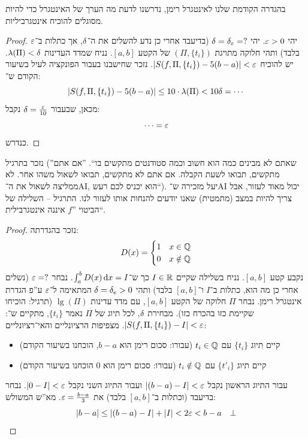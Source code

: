 \documentclass[]{../../../../tex/classes/styledArticle}
\begin{document}
	בהגדרה הקודמת שלנו לאינטגרל רימן, נדרשנו לדעת מה הערך של האינטגרל כדי להיות מסוגלים להוכיח אינטגרביליות. 
	\begin{proof}
		יהי $\eg > 0$. יהי $\dg  = \dg_\eg = ?$ (בדיעבד אחרי כן נדע להשלים את ה־$\delta$, אך כתלות ב־$\eg$ בלבד) ותהי חלוקה מתויגת $(\Pi, \{t_i\})$ של הקטע $[a, b]$. נניח שמדד העדינות $\lambda(\Pi) < \delta$. יש להוכיח $\sof{S(f, \Pi, \{t_i\}) - 5(b - a)} < \eg$. נזכר שחישבנו בעבור הפונקציה לעיל בשיעור הקודם ש־: 
		\[ \left \lvert S(f, \Pi, \{t_i\}) - 5(b-a) \right \rvert \le 10 \cdot \lambda(\Pi) < 10 \delta = \cdots \]
		מכאן, שבעבור $\dg = \frac{\eg}{10}$ נקבל: 
		\[ \cdots = \eg \]
		כנדרש. 
	\end{proof}
	
	נזכר בתרגיל (''שאתם לא מבינים כמה הוא חשוב וכמה סטודנטים מתקשים בו``. ''אם אתם מתקשים, תבואו לשעת הקבלה. אם אתם לא מתקשים, תבואו לשאול משהו אחר. לא ממליצה לשאול את ה־AI, הוא יכניס לכם רעש``). יעל מזכירה ש־AI יכול מאוד לעזור, אבל צריך להיות במצב (מתמטית) שאנו יודעים להנחות אותו לעזור לנו. התרגיל – השלילה של הביטוי ''$f$ איננה אינטגרבילית``. 
	
	\begin{proof}
		נזכר בהגדרתה: 
		\[ D(x) = \begin{cases}
			1 & x \in \mathbb{Q} \\
			0 & x \notin \mathbb{Q}
		\end{cases} \]
		נקבע קטע $[a, b]$. נניח בשלילה שקיים $I \in \mathbb{R}$  כך ש־$\int^b_a D(x) \,\mathrm{d}x = I$. נבחר $\eg = ?$ (נשלים אחרי כן מה הוא, כתלות ב־$I$ ו־$[a, b]$ בלבד) ותהי $\delta = \delta_e > 0$ המתאימה ל־$\eg$ ע''פ הגדרת אינטגרל רימן. נבחר $\Pi$ חלוקה של הקטע $[a, b]$, עם מדד עדינות $\lg(\Pi)$ (תרגיל: הוכיחו שקיימת כזו בהכרח כזו). מבחירת $\delta$, לכל תיוג של $\Pi$ נאמר $\{t_i\}$, מתקיים ש־: $\sof{S(f, \Pi, \{t_i\}) - I} < \eg$. מצפיפות הרציונליים והאי־רציונליים:
		\begin{itemize}
			\item קיים תיוג $\{t_i\}$ עם $t_i \in \mathbb{Q}$ (עבורו: סכום רימן הוא $b - a$, הוכחנו בשיעור הקודם)
			\item קיים תיוג $\{t'_i\}$ עם $t_i \notin \mathbb{Q}$ (עבורו: סכום רימן הוא $0$ הוכחנו בשיעור הקודם)
		\end{itemize}
		עבור התיוג הראשון נקבל $\sof{(b - a) - I} < \eg$ ועבור התיוג השני נקבל $\sof{0 - I} < \eg$. נבחר בדיעבד (וכתלות ב־$[a, b]$ בלבד) את $\eg = \frac{b - a}{3}$. מא''ש המשולש: 
		\[ \sof{b - a} \le \sof{(b - a) - I} + \sof I < 2 \eg < b - a\quad \bot \]\envendproof
	\end{proof}
	
\end{document}

